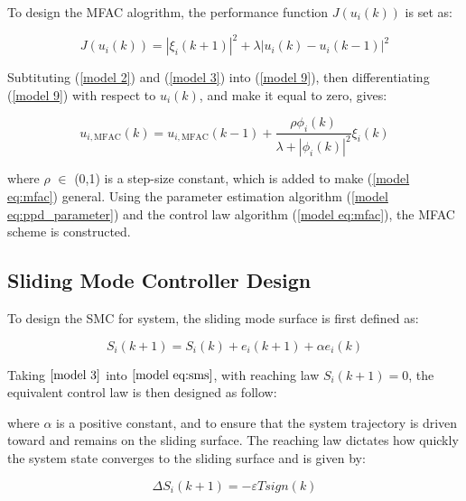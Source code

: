\documentclass[journal,onecolumn]{IEEEtran}
\begin{document}
To design the MFAC alogrithm, the performance function \(J(u_i(k))\) is set as:

\begin{equation}
    \label{model 9}
    J(u_i(k)) = |\xi_i(k+1)|^2 + \lambda|u_i(k) - u_i(k-1)|^2
\end{equation}

Subtituting (\ref{model 2}) and (\ref{model 3}) into (\ref{model 9}), then differentiating (\ref{model 9}) with respect to \(u_i(k)\), and make it equal to zero, gives:

\begin{equation}
    \label{model eq:mfac}
    u_{i,\text{MFAC}}(k) = u_{i,\text{MFAC}}(k - 1) + \frac{\rho \phi_i(k)}{\lambda + |\phi_i(k)|^2} \xi_i(k)
\end{equation}


where \(\rho\) \(\in\) (0,1) is a step-size constant, which is added to make (\ref{model eq:mfac}) general. Using the parameter estimation algorithm (\ref{model eq:ppd_parameter}) and the control law algorithm (\ref{model eq:mfac}), the MFAC scheme is constructed. 


\subsection{Sliding Mode Controller Design}







To design the SMC for system, the sliding mode surface is first defined as:

\begin{equation}
    \label{model eq:sms}
    S_i(k+1) = S_i(k)+e_i(k+1)+\alpha e_i(k) 
\end{equation}

Taking $ \ref{model 3} $ into $ \ref{model eq:sms} $, with reaching law $ S_i(k+1) = 0 $, the equivalent control law is then designed as follow:

where \(\alpha\) is a positive constant, and  to ensure that the system trajectory is driven toward and remains on the sliding surface. The reaching law dictates how quickly the system state converges to the sliding surface and is given by:

\begin{equation}
    \label{model eq:reaching_law}
    \Delta S_i(k+1) = - \varepsilon T sign(k) 
\end{equation}
\end{document}

